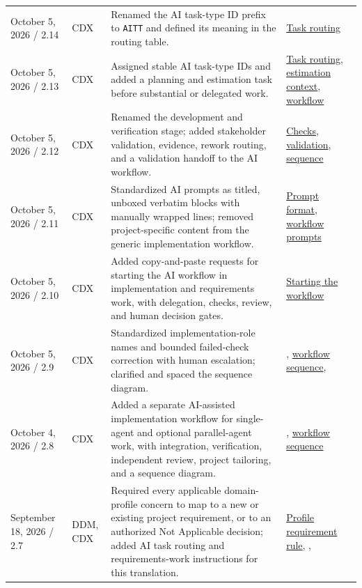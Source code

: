 \begin{tabularx}{\linewidth}{L{3.1cm}L{2.2cm}YL{2.5cm}}
October 5, 2026 / 2.14 & CDX & Renamed the AI task-type ID prefix to \texttt{AITT} and defined its meaning in the routing table. & \hyperref[Table:AISkills]{Task routing}\\
October 5, 2026 / 2.13 & CDX & Assigned stable AI task-type IDs and added a planning and estimation task before substantial or delegated work. & \hyperref[Table:AISkills]{Task routing}, \hyperref[Section:AIPlanningEstimateContext]{estimation context}, \hyperref[Chapter:AIImplementationWorkflow]{workflow}\\
October 5, 2026 / 2.12 & CDX & Renamed the development and verification stage; added stakeholder validation, evidence, rework routing, and a validation handoff to the AI workflow. & \hyperref[Section:AIImplementationVerification]{Checks}, \hyperref[Section:AIImplementationValidation]{validation}, \hyperref[Figure:AIImplementationSequence]{sequence}\\
October 5, 2026 / 2.11 & CDX & Standardized AI prompts as titled, unboxed verbatim blocks with manually wrapped lines; removed project-specific content from the generic implementation workflow. & \hyperref[Section:AIPromptFormatting]{Prompt format}, \hyperref[Section:AIImplementationStart]{workflow prompts}\\
October 5, 2026 / 2.10 & CDX & Added copy-and-paste requests for starting the AI workflow in implementation and requirements work, with delegation, checks, review, and human decision gates. & \hyperref[Section:AIImplementationStart]{Starting the workflow}\\
October 5, 2026 / 2.9 & CDX & Standardized implementation-role names and bounded failed-check correction with human escalation; clarified and spaced the sequence diagram. & , \hyperref[Figure:AIImplementationSequence]{workflow sequence}, \\
October 4, 2026 / 2.8 & CDX & Added a separate AI-assisted implementation workflow for single-agent and optional parallel-agent work, with integration, verification, independent review, project tailoring, and a sequence diagram. & , \hyperref[Figure:AIImplementationSequence]{workflow sequence}\\
September 18, 2026 / 2.7 & DDM, CDX & Required every applicable domain-profile concern to map to a new or existing project requirement, or to an authorized Not Applicable decision; added AI task routing and requirements-work instructions for this translation. & \hyperref[Section:DomainProfileRequirements]{Profile requirement rule}, , \\

\end{tabularx}
